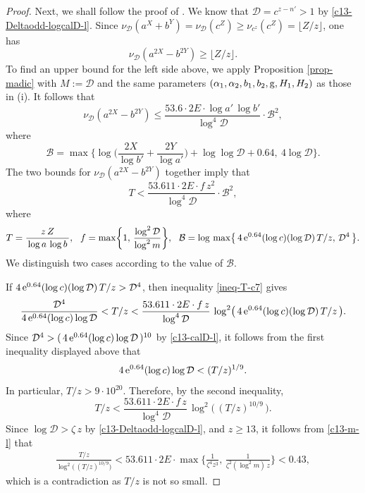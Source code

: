 \documentclass[11pt]{amsart}
\numberwithin{equation}{section}
\begin{document}
\begin{proof}
Next, we shall follow the proof of \cite[Lemma 4.7]{MP3}. 
We know that $\mathcal D = c^{z-n'}>1$ by \eqref{c13-Deltaodd-logcalD-l}.
Since $\nu_{\mathcal D}(a^X+b^Y)=\nu_{\mathcal D}(c^Z) \ge \nu_{c^z}(c^Z) =\lfloor Z/z \rfloor$, one has 
\[
\nu_{\mathcal D}(a^{2X}-b^{2Y}) \ge \lfloor Z/z \rfloor.
\]
To find an upper bound for the left side above, we apply Proposition \ref{prop-madic} with $M:=\mathcal D$ and the same parameters $(\alpha_1,\alpha_2,b_1,b_2,{\rm g},H_1,H_2)$ as those in (i).
It follows that
\[
\nu_{\mathcal D}(a^{2X}-b^{2Y}) \le \frac{53.6 \cdot 2E \cdot \log a'\,\log b'}{\log^4 {\mathcal D}} \cdot \mathcal B^2,
\]
where
\[
\mathcal B=\max \biggr\{ \log \biggr( \frac{2X}{\log b'}+\frac{2Y}{\log a'} \biggr)+\log \log \mathcal D + 0.64, \ 4\log \mathcal D \biggr\}.
\]
The two bounds for $\nu_{\mathcal D}(a^{2X}-b^{2Y})$ together imply that
\begin{equation} \label{ineq-T-c7}
T<\frac{53.611\cdot 2E\cdot f\,z^2}{\log^4 \mathcal D}\cdot \mathcal{B}^2,
\end{equation}
where
\begin{align*}
T=\frac{z\,Z}{\,\log a\,\log b\,}, \ \ 
f %
=\max\biggr\{1,\,\frac{\log^2 \mathcal D}{\log^2 m}\biggr\}, \ \ 
\mathcal{B}=\log\,\max \bigr\{ \,4\,{\rm e}^{0.64}(\log c)(\log \mathcal D)\,T/z, \, {\mathcal D}^4\, \bigr\}.
\end{align*}
We distinguish two cases according to the value of $\mathcal B$.

If $4\,{\rm e}^{0.64}(\log c)(\log \mathcal D)\,T/z>\mathcal D^4$, then inequality \eqref{ineq-T-c7} gives
\[
\frac{\mathcal D^4}{4\,{\rm e}^{0.64}(\log c)\log \mathcal D}<T/z<\frac{53.611\cdot 2E\cdot f\,z}{\log^4 \mathcal D}\,\log^2 \bigr(\,4\,{\rm e}^{0.64}(\log c)(\log \mathcal D)\,T/z\,\bigr).
\]
Since $\mathcal D^4>(\,4\,{\rm e}^{0.64}(\log c)\log \mathcal D\,)^{10}$ by \eqref{c13-calD-l}, it follows from the first inequality displayed above that 
\[
4\,{\rm e}^{0.64}(\log c)\log \mathcal D < (T/z)^{1/9}.
\]
In particular, $T/z>9 \cdot 10^{20}$.
Therefore, by the second inequality, 
\[
T/z<\frac{53.611\cdot 2E\cdot f\,z}{\log^4 \mathcal D}\, \log^2 \bigr(\,(T/z)^{10/9}\,\bigr).
\]
Since $\log \mathcal D>\zeta\,z$ by \eqref{c13-Deltaodd-logcalD-l}, and $z \ge 13$, it follows from \eqref{c13-m-l} that
\begin{align*}
\frac{T/z}{\log^2 \bigr(\,(T/z)^{10/9}\bigr)}
<53.611\cdot 2E\cdot \max\biggr\{\frac{1}{\zeta^4 z^3},\,
\frac{1}{\zeta^2(\log^2 m)\,z}\biggr\}<0.43,
\end{align*}
which is a contradiction as $T/z$ is not so small.


\end{proof}
\end{document}
